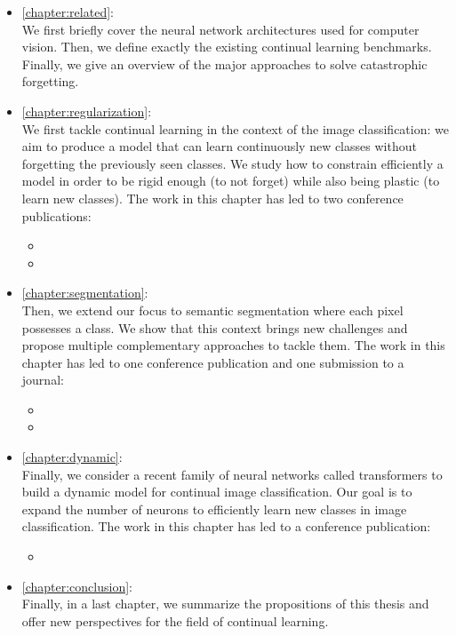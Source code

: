 \begin{itemize}
      \item \autoref{chapter:related}: \\
            We first briefly cover the neural network architectures used for computer vision. Then,
            we define exactly the existing continual learning benchmarks. Finally, we give an
            overview of the major approaches to solve catastrophic forgetting.

      \item \autoref{chapter:regularization}: \\
            We first tackle continual learning in the context of the image classification: we aim to
            produce a model that can learn continuously new classes without forgetting the
            previously seen classes. We study how to constrain efficiently a model in order to be
            rigid enough (to not forget) while also being plastic (to learn new classes). The work in
            this chapter has led to two conference publications:
            \begin{itemize}
                  \item {}
                  \item {}
            \end{itemize}

      \item \autoref{chapter:segmentation}: \\
            Then, we extend our focus to semantic segmentation where each pixel possesses a class.
            We show that this context brings new challenges and propose multiple complementary
            approaches to tackle them. The work in this chapter has led to one conference publication and one
            submission to a journal:
            \begin{itemize}
                  \item {}
                  \item {}
            \end{itemize}

      \item \autoref{chapter:dynamic}: \\
            Finally, we consider a recent family of neural networks called transformers to build a
            dynamic model for continual image classification. Our goal is to expand the number of
            neurons to efficiently learn new classes in image classification. The work in this
            chapter has led to a conference publication:
            \begin{itemize}
                  \item {}
            \end{itemize}

      \item \autoref{chapter:conclusion}: \\
            Finally, in a last chapter, we summarize the propositions of this thesis and offer
            new perspectives for the field of continual learning.

\end{itemize}


